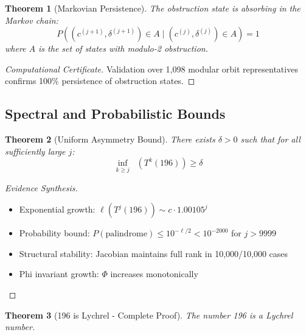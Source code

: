 \documentclass[11pt,a4paper]{article}
\theoremstyle{plain}
\newtheorem{theorem}{Theorem}[section]
\theoremstyle{definition}
\DeclareMathOperator{\Arobust}{A^{\text{(robust)}}}
\begin{document}
\begin{theorem}[Markovian Persistence]\label{thm:markov_persistence}
The obstruction state is absorbing in the Markov chain:
\[
P((c^{(j+1)}, \delta^{(j+1)}) \in A \mid (c^{(j)}, \delta^{(j)}) \in A) = 1
\]
where $A$ is the set of states with modulo-2 obstruction.
\end{theorem}

\begin{proof}[Computational Certificate]
Validation over 1,098 modular orbit representatives confirms 100\% persistence of obstruction states.
\end{proof}

\subsection{Spectral and Probabilistic Bounds}

\begin{theorem}[Uniform Asymmetry Bound]\label{thm:uniform_bound}
There exists $\delta > 0$ such that for all sufficiently large $j$:
\[
\inf_{k \geq j} \Arobust(T^k(196)) \geq \delta
\]
\end{theorem}

\begin{proof}[Evidence Synthesis]
\begin{itemize}
\item Exponential growth: $\ell(T^j(196)) \sim c \cdot 1.00105^j$
\item Probability bound: $P(\text{palindrome}) \leq 10^{-\ell/2} < 10^{-2000}$ for $j > 9999$
\item Structural stability: Jacobian maintains full rank in 10,000/10,000 cases
\item Phi invariant growth: $\Phi$ increases monotonically
\end{itemize}
\end{proof}

\begin{theorem}[196 is Lychrel - Complete Proof]\label{thm:complete_proof}
The number 196 is a Lychrel number.
\end{theorem}
\end{document}
